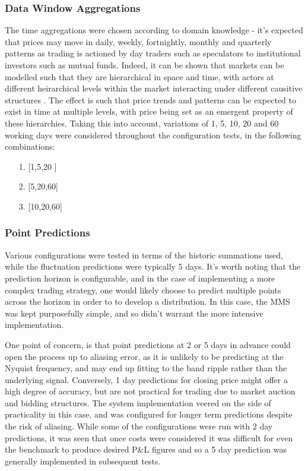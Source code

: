 \documentclass[a4paper,11pt,oneside]{article}
\theoremstyle{plain}
\theoremstyle{definition}
\begin{document}
	\subsubsection{Data Window Aggregations} The time aggregations were chosen according to domain knowledge - it's expected that prices may move in daily, weekly, fortnightly, monthly and quarterly patterns as trading is actioned by day traders such as speculators to institutional investors such as mutual funds. Indeed, it can be shown that markets can be modelled such that they are hierarchical in space and time, with actors at different heirarchical levels within the market interacting under different causitive structures \cite{Wilcox}. The effect is such that price trends and patterns can be expected to exist in time at multiple levels, with price being set as an emergent property of these hierarchies. Taking this into account, variations of 1, 5, 10, 20 and 60 working days were considered throughout the configuration tests, in the following combinations:  
	\begin{itemize}
		\item[1.] [1,5,20 ]
		\item[2.] [5,20,60]
		\item[3.] [10,20,60]
	\end{itemize}
	
	\subsubsection {Point Predictions} Various configurations were tested in terms of the historic summations used, while the fluctuation predictions were typically 5 days. It's worth noting that the prediction horizon is configurable, and in the case of implementing a more complex trading strategy, one would likely choose to predict multiple points across the horizon in order to to develop a distribution. In this case, the MMS was kept purposefully simple, and so didn't warrant the more intensive implementation. \newline
	
	One point of concern, is that point predictions at 2 or 5 days in advance could open the process up to aliasing error, as it is unlikely to be predicting at the Nyquist frequency, and may end up fitting to the band ripple rather than the underlying signal. Conversely, 1 day predictions for closing price might offer a high degree of accuracy, but are not practical for trading due to market auction and bidding structures. The system implementation veered on the side of practicality in this case, and was configured for longer term predictions despite the risk of aliasing. While some of the configurations were run with 2 day predictions, it was seen that once costs were considered it was difficult for even the benchmark to produce desired P\&L figures and so a 5 day prediction was generally implemented in subsequent tests.
	
\end{document}
